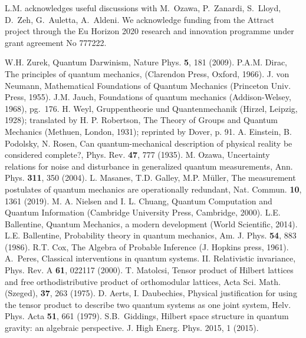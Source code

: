 \documentclass[aps,prl,amsmath,amssymb,twocolumn,nofootinbib]{revtex4}
\theoremstyle{plain}
\theoremstyle{definition}
\theoremstyle{remark}
\begin{document}
	L.M. acknowledges useful discussions with M.~Ozawa, P.~Zanardi,
	S.~Lloyd, D.~Zeh, G.~Auletta, A.~Aldeni. We acknowledge funding from
	the Attract project through the Eu Horizon 2020 research and
	innovation programme under grant agreement No 777222.
	\begin{references}
		 W.H. Zurek, Quantum Darwinism, Nature Phys. {\bf 5},
		181 (2009).
		P.A.M. Dirac, The principles of quantum mechanics,
		(Clarendon Press, Oxford, 1966).
		J. von Neumann, Mathematical Foundations of
		Quantum Mechanics (Princeton Univ.  Press, 1955).
		J.M. Jauch, Foundations of quantum mechanics
		(Addison-Welsey, 1968), pg.~176.
		 H. Weyl, Gruppentheorie und Quantenmechanik (Hirzel,
		Leipzig, 1928); translated by H. P. Robertson, The Theory of Groups
		and Quantum Mechanics (Methuen, London, 1931); reprinted by Dover,
		p. 91.
		A. Einstein, B. Podolsky, N. Rosen, Can
		quantum-mechanical description of physical reality be considered
		complete?, Phys. Rev. {\bf 47}, 777 (1935).
		M. Ozawa, {Uncertainty relations for noise and
			disturbance in generalized quantum measurements}, Ann. Phys.  {\bf
			311}, 350 (2004).
		L. Masanes, T.D. Galley, M.P. M\" uller, The
		measurement postulates of quantum mechanics are operationally
		redundant, Nat. Commun. {\bf 10}, 1361 (2019).
		M. A. Nielsen and I. L. Chuang, Quantum Computation
		and Quantum Information (Cambridge University Press, Cambridge,
		2000).
		L.E. Ballentine, Quantum Mechanics, a modern
		development (World Scientific, 2014).
		L.E. Ballentine, Probability theory in
		quantum mechanics, Am. J. Phys. {\bf 54}, 883 (1986).
		R.T. Cox, The Algebra of Probable Inference (J. Hopkins
		press, 1961).
		A.~Peres, Classical interventions in quantum systems.
		II. Relativistic invariance, Phys. Rev. A {\bf 61}, 022117 (2000).
		 T. Matolcsi, Tensor product of Hilbert lattices and
		free orthodistributive product of orthomodular lattices, Acta Sci.
		Math. (Szeged), {\bf 37}, 263 (1975).
		 D. Aerts, I. Daubechies, Physical justification for
		using the tensor product to describe two quantum systems as one
		joint system, Helv. Phys. Acta {\bf 51}, 661 (1979).
		S.B.~Giddings, Hilbert space structure in quantum
		gravity: an algebraic perspective. J. High Energ. Phys. 2015, 1
		(2015).%

\end{references}
\end{document}
